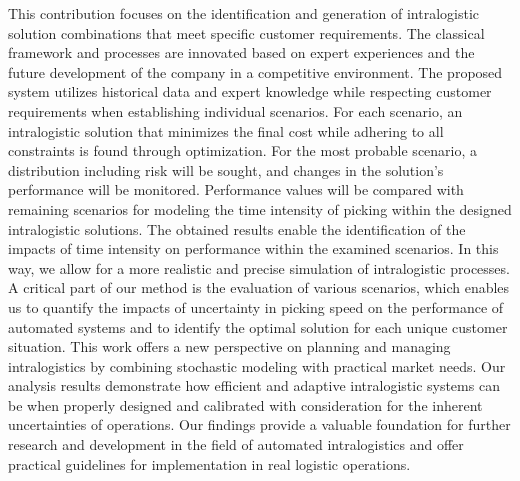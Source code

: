 
\begin{Abstrakt}
    This contribution focuses on the identification and generation of intralogistic solution combinations that meet specific customer requirements. The classical framework and processes are innovated based on expert experiences and the future development of the company in a competitive environment. The proposed system utilizes historical data and expert knowledge while respecting customer requirements when establishing individual scenarios. For each scenario, an intralogistic solution that minimizes the final cost while adhering to all constraints is found through optimization. For the most probable scenario, a distribution including risk will be sought, and changes in the solution's performance will be monitored. Performance values will be compared with remaining scenarios for modeling the time intensity of picking within the designed intralogistic solutions. The obtained results enable the identification of the impacts of time intensity on performance within the examined scenarios. In this way, we allow for a more realistic and precise simulation of intralogistic processes. A critical part of our method is the evaluation of various scenarios, which enables us to quantify the impacts of uncertainty in picking speed on the performance of automated systems and to identify the optimal solution for each unique customer situation. This work offers a new perspective on planning and managing intralogistics by combining stochastic modeling with practical market needs. Our analysis results demonstrate how efficient and adaptive intralogistic systems can be when properly designed and calibrated with consideration for the inherent uncertainties of operations. Our findings provide a valuable foundation for further research and development in the field of automated intralogistics and offer practical guidelines for implementation in real logistic operations.
\end{Abstrakt}



\clearpage